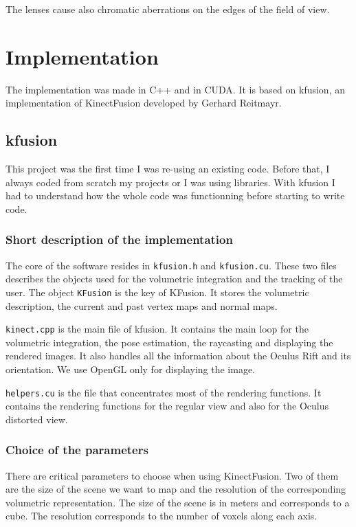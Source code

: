 \documentclass[12pt]{article}
\begin{document}
The lenses cause also chromatic aberrations on the edges of the field of view.

\newpage
\section{Implementation}
The implementation was made in C++ and in CUDA. It is based on kfusion, an implementation of KinectFusion developed by Gerhard Reitmayr.

\subsection{kfusion}
This project was the first time I was re-using an existing code. Before that, I always coded from scratch my projects or I was using libraries. With kfusion I had to understand how the whole code was functionning before starting to write code.

\subsubsection{Short description of the implementation}
The core of the software resides in \texttt{kfusion.h} and \texttt{kfusion.cu}. These two files describes the objects used for the volumetric integration and the tracking of the user. The object \texttt{KFusion} is the key of KFusion. It stores the volumetric description, the current and past vertex maps and normal maps.

\texttt{kinect.cpp} is the main file of kfusion. It contains the main loop for the volumetric integration, the pose estimation, the raycasting and displaying the rendered images. It also handles all the information about the Oculus Rift and its orientation. We use OpenGL only for displaying the image.

\texttt{helpers.cu} is the file that concentrates most of the rendering functions. It contains the rendering functions for the regular view and also for the Oculus distorted view.

\subsubsection{Choice of the parameters}
There are critical parameters to choose when using KinectFusion. Two of them are the size of the scene we want to map and the resolution of the corresponding volumetric representation. The size of the scene is in meters and corresponds to a cube. The resolution corresponds to the number of voxels along each axis.
\end{document}
